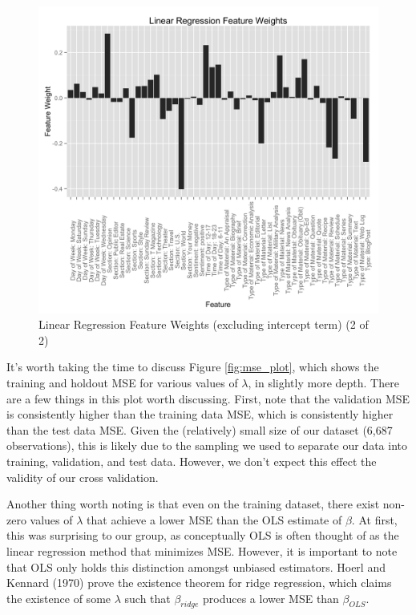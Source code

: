 \documentclass[fleqn,12pt]{SelfArx} %
\begin{document}
\begin{figure}[ht]\centering
\includegraphics[width=\linewidth]{feature_weights_contd.png}
\caption{Linear Regression Feature Weights (excluding intercept term) (2 of 2)}
\label{fig:lin_reg_weights2}
\end{figure}

It's worth taking the time to discuss Figure \ref{fig:mse_plot}, which shows the training and holdout MSE for various values of $\lambda$, in slightly more depth. There are a few things in this plot worth discussing. First, note that the validation MSE is consistently higher than the training data MSE, which is consistently higher than the test data MSE. Given the (relatively) small size of our dataset (6,687 observations), this is likely due to the sampling we used to separate our data into training, validation, and test data. However, we don't expect this effect the validity of our cross validation.

Another thing worth noting is that even on the training dataset, there exist non-zero values of $\lambda$ that achieve a lower MSE than the OLS estimate of $\beta$. At first, this was surprising to our group, as conceptually OLS is often thought of as the linear regression method that minimizes MSE. However, it is important to note that OLS only holds this distinction amongst unbiased estimators. Hoerl and Kennard (1970) \cite{hoerl1970ridge} prove the existence theorem for ridge regression, which claims the existence of some $\lambda$ such that $\beta_{ridge}$ produces a lower MSE than $\beta_{OLS}$. 
\end{document}
